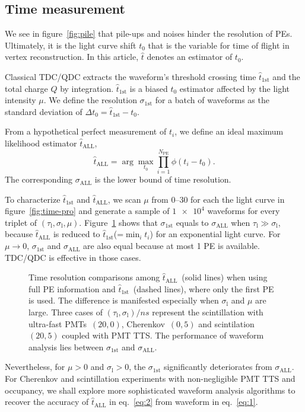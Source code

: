 \subsection{Time measurement}
We see in figure~\ref{fig:pile} that pile-ups and noises hinder the resolution of PEs. Ultimately, it is the light curve shift $t_0$ that is the variable for time of flight in vertex reconstruction.  In this article, $\hat{t}$ denotes an estimator of $t_0$.

Classical TDC/QDC extracts the waveform's threshold crossing time $\hat{t}_\mathrm{1st}$ and the total charge $Q$ by integration.  $\hat{t}_\mathrm{1st}$ is a biased $t_0$ estimator affected by the light intensity $\mu$. We define the resolution $\sigma_\mathrm{1st}$ for a batch of waveforms as the standard deviation of $\Delta t_0 = \hat{t}_\mathrm{1st} - t_0$.

From a hypothetical perfect measurement of $t_i$, we define an ideal maximum likelihood estimator $\hat{t}_\mathrm{ALL}$,
\begin{equation}
  \label{eq:2}
  \hat{t}_\mathrm{ALL} = \arg\underset{t_0}{\max} \prod_{i=1}^{N_\mathrm{PE}} \phi(t_i-t_0).
\end{equation}
The corresponding $\sigma_\mathrm{ALL}$ is the lower bound of time resolution. 

To characterize $\hat{t}_\mathrm{1st}$ and $\hat{t}_\mathrm{ALL}$, we scan $\mu$ from \numrange{0}{30} for each the light curve in figure~\ref{fig:time-pro} and generate a sample of $\num[retain-unity-mantissa=false]{1e4}$ waveforms for every triplet of $(\tau_\mathrm{l}, \sigma_\mathrm{l}, \mu)$.  Figure~\ref{fig:reso-diff} shows that $\sigma_{\mathrm{1st}}$ equals to $\sigma_{\mathrm{ALL}}$ when $\tau_\mathrm{l} \gg \sigma_\mathrm{l}$, because $\hat{t}_\mathrm{ALL}$ is reduced to $\hat{t}_\mathrm{1st}$(=$\min_i t_i$) for an exponential light curve. For $\mu \to 0$, $\sigma_{\mathrm{1st}}$ and $\sigma_{\mathrm{ALL}}$ are also equal because at most 1 PE is available.  TDC/QDC is effective in those cases.

\begin{figure}[H]
  \centering
  \resizebox{0.8\textwidth}{!}{}
  \caption{\label{fig:reso-diff} Time resolution comparisons among $\hat{t}_{\mathrm{ALL}}$~(solid lines) when using full PE information and $\hat{t}_\mathrm{1st}$~(dashed lines), where only the first PE is used. The difference is manifested especially when $\sigma_\mathrm{l}$ and $\mu$ are large. Three cases of $(\tau_\mathrm{l}, \sigma_\mathrm{l})/\si{ns}$ represent the scintillation with ultra-fast PMTs~$(20, 0)$, Cherenkov~$(0, 5)$ and scintilation~$(20, 5)$ coupled with PMT TTS. The performance of waveform analysis lies between $\sigma_{\mathrm{1st}}$ and $\sigma_{\mathrm{ALL}}$. }
\end{figure}

Nevertheless, for $\mu >0$ and $\sigma_\mathrm{l} > 0$, the $\sigma_{\mathrm{1st}}$ significantly deteriorates from $\sigma_{\mathrm{ALL}}$.  For Cherenkov and scintillation experiments with non-negligible PMT TTS and occupancy, we shall explore more sophisticated waveform analysis algorithms to recover the accuracy of $\hat{t}_\mathrm{ALL}$ in eq.~\eqref{eq:2} from waveform in eq.~\eqref{eq:1}.
